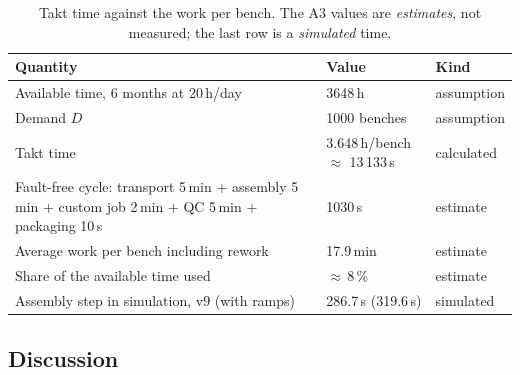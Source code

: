 \begin{table}[H]
    \centering
    \caption{Takt time against the work per bench. The A3 values are \emph{estimates}, not measured;
    the last row is a \emph{simulated} time.}
    \label{tab:lean}
    \small
    \begin{tabular}{p{72mm} l l}
        \hline
        Quantity & Value & Kind \\
        \hline
        Available time, 6 months at 20\,h/day & 3648\,h & assumption \\
        Demand \(D\) & 1000 benches & assumption \\
        Takt time & 3.648\,h/bench \(\approx\) 13\,133\,s & calculated \\
        Fault-free cycle: transport 5\,min + assembly 5\,min + custom job 2\,min + QC 5\,min + packaging 10\,s & 1030\,s & estimate \\
        Average work per bench including rework & 17.9\,min & estimate \\
        Share of the available time used & \(\approx\)\,8\,\% & estimate \\
        Assembly step in simulation, v9 (with ramps) & 286.7\,s (319.6\,s) & simulated \\
        \hline
    \end{tabular}
\end{table}

\subsection{Discussion}

